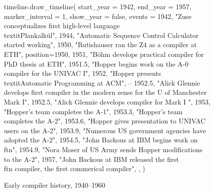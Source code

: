 \pagebreak
\begin{figure}[h]
\begin{luacode}
timeline.draw_timeline({ 
    start_year = 1942,
    end_year = 1957,
    marker_interval = 1,
    show_year = false,
    events = {
        {1942, "Zuse conceptualizes first high-level language \\textit{Plankalkül}"},
        {1944, "Automatic Sequence Control Calculator started working"},
        {1950, "Rutishauser ran the Z4 as a compiler at ETH", position=1950},
        {1951, "B{\"o}hm develops practical compiler for PhD thesis at ETH"},
        {1951.5, "Hopper begins work on the A-0 compiler for the UNIVAC I"},
        {1952, "Hopper presents \\textit{Automatic Programming} at ACM"},
        -- {1952.5, "Alick Glennie develops first compiler in the modern sense for the U of Manchester Mark I"},
        {1952.5, "Alick Glennie develops compiler for Mark I "},
        {1953, "Hopper's team completes the A-1"},
        {1953.3, "Hopper's team completes the A-2"},
        {1953.6, "Hopper gives presentation to UNIVAC users on the A-2"},
        {1953.9, "Numerous US government agencies have adopted the A-2"},
        {1954.5, "John Backous at IBM begins work on \\ftn{}"},
        {1954.9, "Nora Moser of US Army sends Hopper modifications to the A-2"},
        {1957, "John Backous at IBM released the first \\ftn{} compiler, the first commerical compiler"},
    },
})
\end{luacode}
\caption{Early compiler history, 1940--1960}
\label{fig:dawn-timeline}
\end{figure}
